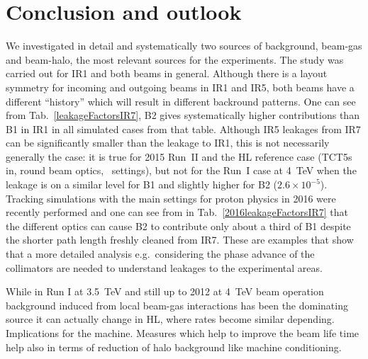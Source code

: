 \section{Conclusion and outlook}

We investigated in detail and systematically two sources of background, beam-gas and beam-halo, the most relevant sources for the experiments. The study was carried out for IR1 and both beams in general. Although there is a layout symmetry for incoming and outgoing beams in IR1 and IR5, both beams have a different ``history'' which will result in different backround patterns. One can see from Tab.~\ref{leakageFactorsIR7}, B2 gives systematically higher contributions than B1 in IR1 in all simulated cases from that table. Although IR5 leakages from IR7 can be significantly smaller than the leakage to IR1, this is not necessarily generally the case: it is true for 2015 Run~II and the HL reference case (TCT5s in, round beam optics, \twosigmaret~settings), but not for the Run~I case at 4~TeV when the leakage is on a similar level for B1 and slightly higher for B2 ($2.6 \times 10^{-5}$). Tracking simulations with the main settings for proton physics in 2016 were recently performed and one can see from in Tab.~\ref{2016leakageFactorsIR7} that the different optics can cause B2 to contribute only about a third of B1 despite the shorter path length freshly cleaned from IR7. These are examples that show that a more detailed analysis e.g.~considering the phase advance of the collimators are needed to understand leakages to the experimental areas.




While in Run I at 3.5~TeV and still up to 2012 at 4~TeV beam operation background induced from local beam-gas interactions has been the dominating source it can actually change in HL, where rates become similar depending. 
Implications for the machine.
Measures which help to improve the beam life time help also in terms of reduction of halo background like machine conditioning. 
